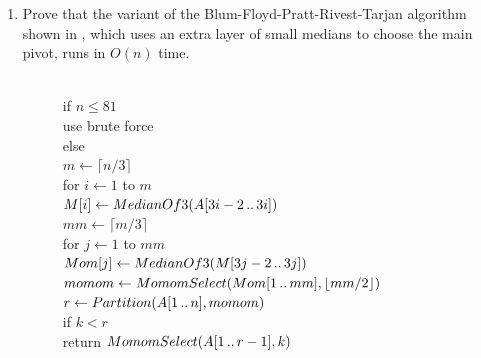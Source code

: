 \begin{exercises}
\begin{enumerate}[label=\arabic*.,ref=\thechapter.\arabic*,leftmargin=*,align=left,itemsep=1.5ex plus 0.5ex,resume]
\begin{enumerate}
\item For any constants $b \ge 5$, the algorithm $_b$ runs in $O(n)$ time, but different values of $b$ lead to different constant factors. Let $M(b)$ denote the minimum number of comparisons required to find the median of $b$ numbers. The exact value of $M(b)$ is known only for $b \le 13$:
\[
\begin{array}{c|ccccccccccccc}
b & 1 & 2 & 3 & 4 & 5 & 6 & 7 & 8 & 9 & 10 & 11 & 12 & 13\\
\hline
M(b) & 0 & 1 & 3 & 4 & 6 & 8 & 10 & 12 & 14 & 16 & 18 & 20 & 23
\end{array}
\]
For each $b$ between $5$ and $13$, find an upper bound on the running time of $_b$ of the form $T(n) \le \alpha_b n$ for some explicit constant $\alpha_b$. (For example, on page 39 we showed that $\alpha_5 \le 16$.)
\item Which value of $b$ yields the smallest constant $\alpha_b$? 
\end{enumerate}
\item Prove that the variant of the Blum-Floyd-Pratt-Rivest-Tarjan  algorithm shown in , which uses an extra layer of small medians to choose the main pivot, runs in $O(n)$ time.
\begin{figure}[ht]
\centering
\begin{pseudocode}
\\
if $n \le 81$\\
\Indent use brute force\\
else\\
\Indent $m \gets \lceil n/3\rceil$\\
\Indent for $i \gets 1$ to $m$\\
\Indent\Indent $M[i] \gets MedianOf3(A[3i-2\,..\,3i])$\\
\Indent $mm \gets \lceil m/3\rceil$\\
\Indent for $j \gets 1$ to $mm$\\
\Indent\Indent $Mom[j] \gets MedianOf3(M[3j-2\,..\,3j])$\\
\Indent $momom \gets MomomSelect(Mom[1\,..\,mm], \lfloor mm/2\rfloor)$\\
\Indent $r \gets Partition(A[1\,..\,n], momom)$\\
\Indent if $k < r$\\
\Indent\Indent return $MomomSelect(A[1\,..\,r-1], k)$\\

\end{pseudocode}
\end{figure}
\end{enumerate}
\end{exercises}
